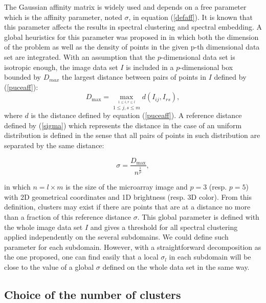 \documentclass[runningheads,a4paper]{llncs}
\begin{document}
The Gaussian affinity matrix is widely used and depends on a free parameter
which is the affinity parameter, noted $\sigma$, in equation (\ref{defaff}). It
is known that this parameter affects the results in spectral clustering and
spectral embedding. A global heuristics for this parameter was proposed in
\cite{vec08b} in which both the dimension of the problem as well as the
density of points in the given p-th dimensional data set are  integrated. With
an assumption that the $p$-dimensional data set is isotropic enough, the image
data set $I$ is included in a $p$-dimensional box bounded by $D_{max}$ the
largest distance between pairs of points in $I$ defined by (\ref{puceaff}): $$
D_{\max} = \max_{ \stackrel{1\leq i,r \leq l}{1\leq j,s \leq m} }
d(I_{ij},I_{rs}),$$ where $d$ is the distance defined by equation
(\ref{puceaff}).
A reference distance defined by (\ref{sigma}) which represents the distance in
the case of an uniform distribution is defined in the sense that all pairs of
points in such distribution are separated by the same distance:


\begin{equation}
 \sigma = \frac{D_{\max}}{n^{\frac{1}{p}}}, \label{sigma}
\end{equation}

in which $n=l\times m$ is the size of the microarray image and  $p=3$ (resp.
$p=5$) with 2D geometrical coordinates and 1D brightness (resp. 3D color).
From this definition, clusters may exist if there are points that are at a
distance no more than a fraction of this reference distance $\sigma$.
This global parameter is defined with the whole image data set $I$ and gives a
threshold for all spectral clustering applied independently on the several
subdomains.
We could define such parameter for each subdomain. However, with a
straightforward decomposition as the one proposed, one can find easily that a
local $\sigma_{l}$ in each subdomain will be close to the value of a global
$\sigma$ defined on the whole data set in the same way.

\subsection{Choice of the number of clusters}
\end{document}
